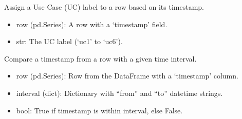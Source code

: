 \documentclass[letterpaper,10pt,english]{sphinxmanual}
\begin{document}
\begin{fulllineitems}
\label{\detokenize{add_current_uc:add_current_uc.apply_uc}}
\pysigstartsignatures
{}
\pysigstopsignatures
\sphinxAtStartPar
Assign a Use Case (UC) label to a row based on its timestamp.
\begin{description}
\begin{itemize}
\item {} 
\sphinxAtStartPar
row (pd.Series): A row with a ‘timestamp’ field.

\end{itemize}

\begin{itemize}
\item {} 
\sphinxAtStartPar
str: The UC label (‘uc1’ to ‘uc6’).

\end{itemize}

\end{description}

\end{fulllineitems}


\begin{fulllineitems}
\label{\detokenize{add_current_uc:add_current_uc.compare_intervals}}
\pysigstartsignatures
{}
\pysigstopsignatures
\sphinxAtStartPar
Compare a timestamp from a row with a given time interval.
\begin{description}
\begin{itemize}
\item {} 
\sphinxAtStartPar
row (pd.Series): Row from the DataFrame with a ‘timestamp’ column.

\item {} 
\sphinxAtStartPar
interval (dict): Dictionary with “from” and “to” datetime strings.

\end{itemize}

\begin{itemize}
\item {} 
\sphinxAtStartPar
bool: True if timestamp is within interval, else False.

\end{itemize}

\end{description}

\end{fulllineitems}
\end{document}
